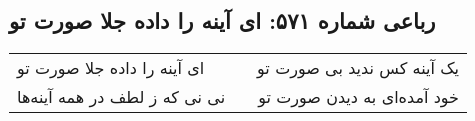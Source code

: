 \begin{center}
\section*{رباعی شماره ۵۷۱: ای آینه را داده جلا صورت تو}
\label{sec:sh571}
\begin{longtable}{l p{0.5cm} r}
ای آینه را داده جلا صورت تو
&&
یک آینه کس ندید بی صورت تو
\\
نی نی که ز لطف در همه آینه‌ها
&&
خود آمده‌ای به دیدن صورت تو
\\
\end{longtable}
\end{center}
